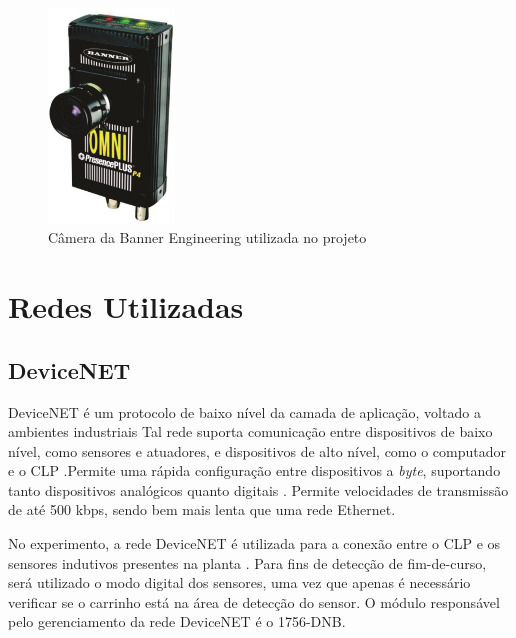 \begin{figure}[!ht]
  \centering
    \includegraphics[width=0.3\textwidth]{figs/fundamentos/camera}
    \caption{Câmera da Banner Engineering utilizada no projeto \cite{redytton}\label{cameraBanner}}
\end{figure}

\section{Redes Utilizadas}
\subsection{DeviceNET}
DeviceNET é um protocolo de baixo nível da camada de aplicação, voltado a ambientes industriais \cite{dnetrta} Tal rede suporta comunicação entre dispositivos de baixo nível, como sensores e atuadores, e dispositivos de alto nível, como o computador e o CLP \cite{devicenetrockwell}.Permite uma rápida configuração entre dispositivos a \textit{byte}, suportando tanto dispositivos analógicos quanto digitais \cite{redytton}. Permite velocidades de transmissão de até 500 kbps, sendo bem mais lenta que uma rede Ethernet.

No experimento, a rede DeviceNET é utilizada para a conexão entre o CLP e os sensores indutivos presentes na planta \cite{redytton}.  Para fins de detecção de fim-de-curso, será utilizado o modo digital dos sensores, uma vez que apenas é necessário verificar se o carrinho está na área de detecção do sensor. O módulo responsável pelo gerenciamento da rede DeviceNET é o 1756-DNB.

